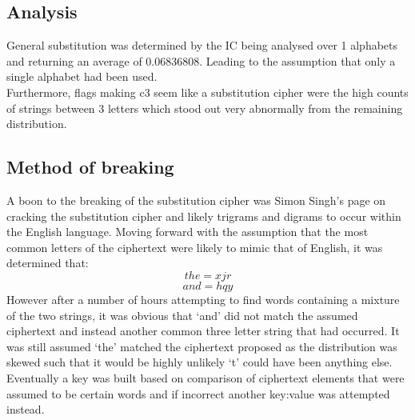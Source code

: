 \documentclass{article}
\begin{document}
      \subsection{Analysis}
      General substitution was determined by the IC being analysed over 1 alphabets 
      and returning an average of 0.06836808. Leading to the assumption that only a single
      alphabet had been used.\\
      Furthermore, flags making c3 seem like a substitution cipher were the high counts of strings
      between 3  letters which stood out very abnormally from the remaining distribution.\\
      \subsection{Method of breaking} 
      A boon to the breaking of the substitution cipher was Simon Singh's page\cite{SimonSinghNetTBC}
      on cracking the substitution cipher and likely trigrams and digrams to occur within the English language.
      Moving forward with the assumption that the most common letters of the ciphertext were likely
      to mimic that of English, it was determined that: \[the = xjr\] \[and = hqy\]
      However after a number of hours attempting to find words containing a mixture of the two
      strings, it was obvious that `and' did not match the assumed ciphertext and instead another
      common three letter string that had occurred. It was still assumed `the' matched the ciphertext proposed
      as the distribution was skewed such that it would be highly unlikely `t' could have been 
      anything else.\\
      Eventually a key was built based on comparison of ciphertext elements that were assumed to be certain words
      and if incorrect another key:value was attempted instead. \\
\end{document}
